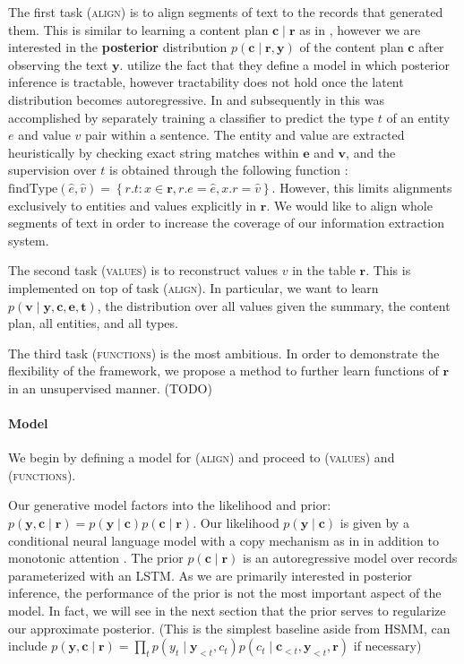 \documentclass[11pt]{article}
\newcommand\set[1]{\left\{#1\right\}}
\newcommand{\bc}{\mathbf{c}}
\newcommand{\be}{\mathbf{e}}
\newcommand{\br}{\mathbf{r}}
\newcommand{\bt}{\mathbf{t}}
\newcommand{\bv}{\mathbf{v}}
\newcommand{\by}{\mathbf{y}}
\begin{document}
The first task (\textsc{align}) is to align segments of text to the records that generated them.
This is similar to learning a content plan $\bc\mid\br$ as in \citet{puduppully2018contentselection},
however we are interested in the \textbf{posterior} distribution $p(\bc\mid\br,\by)$ of
the content plan $\bc$ after observing the text $\by$.
\citet{liang2009semalign} utilize the fact that they define a model in which posterior inference is tractable,
however tractability does not hold once the latent distribution becomes autoregressive.
In \citet{wiseman2017d2t} and subsequently in \citet{puduppully2018contentselection} this was accomplished by 
separately training a classifier to predict the type $t$ of an entity $e$ and value $v$ pair within a sentence.
The entity and value are extracted heuristically by checking exact string matches within $\be$ and $\bv$,
and the supervision over $t$ is obtained through the following function \citep{wiseman2017d2t}:
$\text{findType}(\hat{e},\hat{v}) = \set{ r.t :x\in\br, r.e = \hat{e}, x.r = \hat{v}}$.
However, this limits alignments exclusively to entities and values explicitly in $\br$.
We would like to align whole segments of text in order to increase the coverage
of our information extraction system.


The second task (\textsc{values}) is to reconstruct values $v$ in the table $\br$.
This is implemented on top of task (\textsc{align}).
In particular, we want to learn $p(\bv \mid \by,\bc,\be,\bt)$,
the distribution over all values given the summary, the content plan, all entities, and all types.

The third task (\textsc{functions}) is the most ambitious.
In order to demonstrate the flexibility of the framework,
we propose a method to further learn functions of $\br$ in an unsupervised manner.
(TODO)

\paragraph{Model}
We begin by defining a model for (\textsc{align})
and proceed to (\textsc{values}) and (\textsc{functions}).

Our generative model factors into the
likelihood and prior: $p(\by,\bc\mid\br)=p(\by\mid\bc)p(\bc\mid\br)$.
Our likelihood $p(\by\mid\bc)$ is given by a conditional neural language model
with a copy mechanism as in \citet{gulcehre2016cc,wiseman2017d2t}
in addition to monotonic attention \citep{yu2016ssnt,wiseman2018template}.
The prior $p(\bc\mid\br)$ is an autoregressive model over records
parameterized with an LSTM.
As we are primarily interested in posterior inference, the performance of the prior is
not the most important aspect of the model.
In fact, we will see in the next section that the prior serves to regularize
our approximate posterior.
(This is the simplest baseline aside from HSMM, can include 
$p(\by,\bc\mid\br)=\prod_tp(y_t\mid\by_{<t},c_t)p(c_t\mid\bc_{<t},\by_{<t},\br)$
if necessary)
\end{document}
